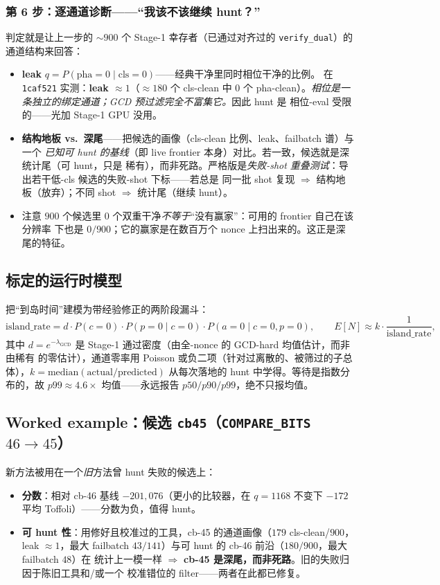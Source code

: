 \documentclass[11pt]{ctexart}
\let\c\lstinline
\begin{document}
\subsubsection*{第 6 步：逐通道诊断——``我该不该继续 hunt？''}
\label{ssec:chan}
判定就是让上一步的 $\sim 900$ 个 Stage-1 幸存者（已通过对齐过的 \c{verify_dual}）的通道结构来回答：
\begin{itemize}[nosep]
  \item \textbf{leak} $q = P(\text{pha}{=}0 \mid \text{cls}{=}0)$——经典干净里同时相位干净的比例。
  在 \texttt{1caf521} 实测：\textbf{leak $\approx 1$}（$\approx 180$ 个 cls-clean 中 $0$ 个
  pha-clean）。\emph{相位是一条独立的绑定通道；GCD 预过滤完全不富集它。}因此 hunt 是
  相位-eval 受限的——光加 Stage-1 GPU 没用。
  \item \textbf{结构地板 vs.\ 深尾}——把候选的画像（cls-clean 比例、leak、failbatch 谱）与一个
  \emph{已知可 hunt 的基线}（即 live frontier 本身）对比。若一致，候选就是深统计尾（可 hunt，只是
  稀有），而非死路。严格版是\emph{失败-shot 重叠测试}：导出若干低-cls 候选的失败-shot 下标——若总是
  同一批 shot 复现 $\Rightarrow$ 结构地板（放弃）；不同 shot $\Rightarrow$ 统计尾（继续 hunt）。
  \item 注意 $900$ 个候选里 $0$ 个双重干净\emph{不等于}``没有赢家''：可用的 frontier 自己在该分辨率
  下也是 $0/900$；它的赢家是在数百万个 nonce 上扫出来的。这正是深尾的特征。
\end{itemize}

\subsection{标定的运行时模型}
\label{ssec:rt}
把``到岛时间''建模为带经验修正的两阶段漏斗：
\[
  \text{island\_rate} = d \cdot P(c{=}0)\cdot P(p{=}0\mid c{=}0)\cdot P(a{=}0\mid c{=}0,p{=}0),
  \qquad
  E[N] \approx k\cdot \frac{1}{\text{island\_rate}},
\]
其中 $d=e^{-\lambda_{\text{GCD}}}$ 是 Stage-1 通过密度（由全-nonce 的 GCD-hard 均值估计，而非由稀有
的零估计），通道零率用 Poisson 或负二项（针对过离散的、被筛过的子总体），$k=\text{median}
(\text{actual}/\text{predicted})$ 从每次落地的 hunt 中学得。等待是指数分布的，故 $p99\approx
4.6\times$ 均值——永远报告 $p50/p90/p99$，绝不只报均值。

\subsection{Worked example：候选 \texttt{cb45}（\texttt{COMPARE\_BITS} $46{\to}45$）}
新方法被用在一个\emph{旧}方法曾 hunt 失败的候选上：
\begin{itemize}[nosep]
  \item \textbf{分数}：相对 cb-46 基线 $-201{,}076$（更小的比较器，在 $q{=}1168$ 不变下 $-172$ 平均
  Toffoli）——分数为负，值得 hunt。
  \item \textbf{可 hunt 性}：用修好且校准过的工具，cb-45 的通道画像（$179$ cls-clean/$900$，leak
  $\approx 1$，最大 failbatch $43/141$）与可 hunt 的 cb-46 前沿（$180/900$，最大 failbatch $48$）在
  统计上一模一样 $\Rightarrow$ \textbf{cb-45 是深尾，而非死路}。旧的失败归因于陈旧工具和/或一个
  校准错位的 filter——两者在此都已修复。
\end{itemize}
\end{document}

